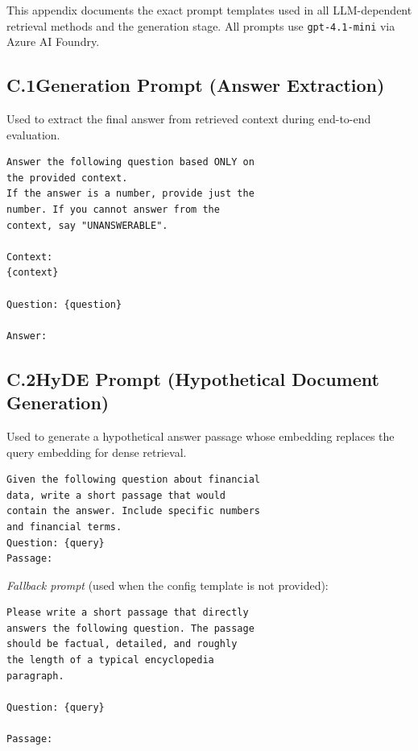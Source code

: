 \documentclass[11pt]{article}
\begin{document}
This appendix documents the exact prompt templates used in all LLM-dependent retrieval methods and the generation stage. All prompts use \texttt{gpt-4.1-mini} via Azure AI Foundry.

\subsection*{C.1\quad Generation Prompt (Answer Extraction)}

Used to extract the final answer from retrieved context during end-to-end evaluation.

\begin{scriptsize}
\begin{verbatim}
Answer the following question based ONLY on
the provided context.
If the answer is a number, provide just the
number. If you cannot answer from the
context, say "UNANSWERABLE".

Context:
{context}

Question: {question}

Answer:
\end{verbatim}
\end{scriptsize}

\subsection*{C.2\quad HyDE Prompt (Hypothetical Document Generation)}

Used to generate a hypothetical answer passage whose embedding replaces the query embedding for dense retrieval.

\begin{scriptsize}
\begin{verbatim}
Given the following question about financial
data, write a short passage that would
contain the answer. Include specific numbers
and financial terms.
Question: {query}
Passage:
\end{verbatim}
\end{scriptsize}

\noindent\textit{Fallback prompt} (used when the config template is not provided):

\begin{scriptsize}
\begin{verbatim}
Please write a short passage that directly
answers the following question. The passage
should be factual, detailed, and roughly
the length of a typical encyclopedia
paragraph.

Question: {query}

Passage:
\end{verbatim}
\end{scriptsize}
\end{document}
